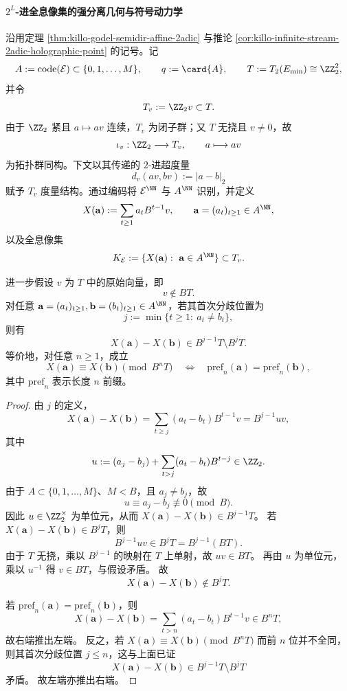 \paragraph{\texorpdfstring{$2^L$}{2^L}-进全息像集的强分离几何与符号动力学}
沿用定理 \ref{thm:killo-godel-semidir-affine-2adic} 与推论 \ref{cor:killo-infinite-stream-2adic-holographic-point} 的记号。记
\[
A:=\mathrm{code}(\mathcal E)\subset\{0,1,\dots,M\},\qquad
q:=\card{A},\qquad
T:=T_2(E_{\min})\cong\ZZ_2^2,
\]
并令
\[
T_v:=\ZZ_2 v\subset T.
\]
由于 \(\ZZ_2\) 紧且 \(a\mapsto av\) 连续，\(T_v\) 为闭子群；又 \(T\) 无挠且 \(v\neq 0\)，故
\[
\iota_v:\ZZ_2\longrightarrow T_v,\qquad a\longmapsto av
\]
为拓扑群同构。下文以其传递的 \(2\)-进超度量
\[
d_v(av,bv):=|a-b|_2
\]
赋予 \(T_v\) 度量结构。通过编码将 \(\mathcal E^\NN\) 与 \(A^\NN\) 识别，并定义
\[
X(\mathbf a):=\sum_{t\ge 1}a_t B^{t-1}v,\qquad
\mathbf a=(a_t)_{t\ge 1}\in A^\NN,
\]
以及全息像集
\[
K_{\mathcal E}:=\{X(\mathbf a):\ \mathbf a\in A^\NN\}\subset T_v.
\]

\begin{theorem}\label{thm:killo-2adic-holographic-exact-cylinder-separation}
进一步假设 \(v\) 为 \(T\) 中的原始向量，即
\[
v\notin BT.
\]
对任意 \(\mathbf a=(a_t)_{t\ge 1},\mathbf b=(b_t)_{t\ge 1}\in A^\NN\)，若其首次分歧位置为
\[
j:=\min\{t\ge 1:\ a_t\neq b_t\},
\]
则有
\[
X(\mathbf a)-X(\mathbf b)\in B^{j-1}T\setminus B^jT.
\]
等价地，对任意 \(n\ge 1\)，成立
\[
X(\mathbf a)\equiv X(\mathbf b)\pmod{B^nT}
\quad\Longleftrightarrow\quad
\mathrm{pref}_n(\mathbf a)=\mathrm{pref}_n(\mathbf b),
\]
其中 \(\mathrm{pref}_n\) 表示长度 \(n\) 前缀。
\end{theorem}
\begin{proof}
由 \(j\) 的定义，
\[
X(\mathbf a)-X(\mathbf b)
=
\sum_{t\ge j}(a_t-b_t)B^{t-1}v
=
B^{j-1}uv,
\]
其中
\[
u:=(a_j-b_j)+\sum_{t>j}(a_t-b_t)B^{t-j}\in \ZZ_2.
\]
由于 \(A\subset\{0,1,\dots,M\}\)、\(M<B\)，且 \(a_j\neq b_j\)，故
\[
u\equiv a_j-b_j\not\equiv 0\pmod B.
\]
因此 \(u\in\ZZ_2^\times\) 为单位元，从而 \(X(\mathbf a)-X(\mathbf b)\in B^{j-1}T\)。
若 \(X(\mathbf a)-X(\mathbf b)\in B^jT\)，则
\[
B^{j-1}uv\in B^jT=B^{j-1}(BT).
\]
由于 \(T\) 无挠，乘以 \(B^{j-1}\) 的映射在 \(T\) 上单射，故 \(uv\in BT\)。
再由 \(u\) 为单位元，乘以 \(u^{-1}\) 得 \(v\in BT\)，与假设矛盾。
故
\[
X(\mathbf a)-X(\mathbf b)\notin B^jT.
\]

若 \(\mathrm{pref}_n(\mathbf a)=\mathrm{pref}_n(\mathbf b)\)，则
\[
X(\mathbf a)-X(\mathbf b)=\sum_{t>n}(a_t-b_t)B^{t-1}v\in B^nT,
\]
故右端推出左端。
反之，若 \(X(\mathbf a)\equiv X(\mathbf b)\pmod{B^nT}\) 而前 \(n\) 位并不全同，则其首次分歧位置 \(j\le n\)，这与上面已证
\[
X(\mathbf a)-X(\mathbf b)\in B^{j-1}T\setminus B^jT
\]
矛盾。
故左端亦推出右端。
\end{proof}

